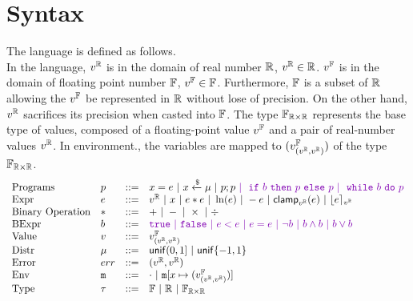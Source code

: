 \documentclass[a4paper,11pt]{article}
\begin{document}
\section{Syntax}
The language is defined as follows.
\\
In the language, $v^{\mathbb{R}}$ is in the domain of real number $\mathbb{R}$, $v^{\mathbb{R}} \in \mathbb{R}$. 
$v^{\mathbb{F}}$ is in the domain of floating point number $\mathbb{F}$, $v^{\mathbb{F}} \in \mathbb{F}$. 
Furthermore, $\mathbb{F}$ is a subset of $\mathbb{R}$ allowing the $v^{\mathbb{F}}$ be represented in $\mathbb{R}$ without lose of precision. 
On the other hand, $v^{\mathbb{R}}$ sacrifices its precision when casted into $\mathbb{F}$.
The type $\mathbb{F}_{\mathbb{R} \times \mathbb{R}}$ represents the base type of values, composed of a floating-point value $v^{\mathbb{F}}$ and a pair of real-number values $v^{\mathbb{R}}$.
In environment., the variables are mapped to $(v^{\mathbb{F}}_{(v^{\mathbb{R}}, v^{\mathbb{R}})})$ of the type $\mathbb{F}_{\mathbb{R} \times \mathbb{R}}$.
%
\[\begin{array}{llll}
\mbox{Programs} & \prog & ::= &
    \varx = \expr ~|~ \varx \samplel \edistr
	~|~ \prog ; \prog  
	\extend{ ~|~ \eif \bexpr \ethen \prog \eelse \prog
		~|~ \ewhile \bexpr \edo \prog }\\
%
\mbox{Expr} & \expr & ::= & \rval
	~|~ \varx  ~|~ \expr \bop \expr
	~|~ \ln (\expr) ~|~ - \expr ~|~ \clamp_{\rval}(\expr)
	~|~ \round{\expr}_{\rval}  \\
%
\mbox{Binary Operation} & \bop & ::= & + ~|~ - ~|~ \times ~|~ \div \\
%
\mbox{BExpr} & \bexpr & ::= & \extend{ \etrue ~|~ \efalse
	~|~ \expr < \expr
 	~|~ \expr = \expr  ~|~ \neg \bexpr
 	~|~ \bexpr \land \bexpr
 	~|~ \bexpr \lor \bexpr } \\
%
%
\mbox{Value} & \valv & ::= & \fval_{(\rval, \rval)}\\
%
\mbox{Distr} & \edistr & ::= & \uniform(0, 1]
%
	~|~ \uniform\{-1, 1\}\\ 
%
\mbox{Error} & \err & ::= & (\rval, \rval) \\
%
\mbox{Env} & \trsmem & ::= & \cdot ~|~ \trsmem[x \mapsto (\fval_{(\rval, \rval)})]\\
%
\mbox{Type} & \tau & ::= & \float ~|~ \real ~|~ \float_{\real \times \real}
\end{array}
\]


%
\end{document}
